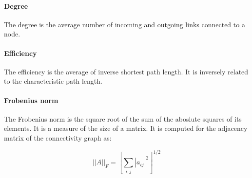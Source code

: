       \paragraph{Degree}
      \label{sec:degree}
      The degree is the average number of incoming and outgoing links connected to a node.

      \paragraph{Efficiency}
      \label{sec:efficiency}
      The efficiency is the average of inverse shortest path length.
      It is inversely related to the characteristic path length.

      \paragraph{Frobenius norm}
      \label{sec:norm}
      The Frobenius norm is the square root of the sum of the aboslute squares of its elements.
      It is a measure of the size of a matrix.
      It is computed for the adjacency matrix of the connectivity graph as:

      \begin{equation}
        ||A||_F = \left[\sum\limits_{i,j}|a_{ij}|^2\right]^{1/2}
      \end{equation}
